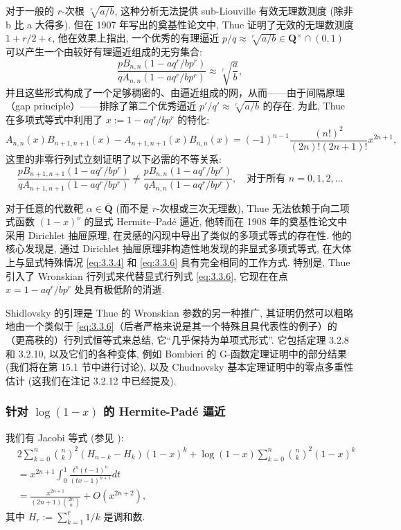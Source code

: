 对于一般的 $r$-次根 \(\sqrt[r]{a/b}\), 这种分析无法提供 sub-Liouville 有效无理数测度 (除非 b 比 a 大得多). 
但在 1907 年写出的奠基性论文中, Thue 证明了无效的无理数测度 \(1+r/2+\epsilon\), 
他在效果上指出, 一个优秀的有理逼近 \(p/q \approx \sqrt[r]{a/b} \in \mathbf{Q}^{\times} \cap (0,1)\) 
可以产生一个由较好有理逼近组成的无穷集合:
\[ \frac{pB_{n,n}\left(1-aq^r/bp^r\right)}{qA_{n,n}\left(1-aq^r/bp^r\right)} \approx \sqrt[r]{\frac{a}{b}}, \]
并且这些形式构成了一个足够稠密的、由逼近组成的网，从而——由于间隔原理（gap principle）——排除了第二个优秀逼近 \(p'/q' \approx \sqrt[r]{a/b}\) 的存在. 
为此, Thue 在多项式等式中利用了 \(x := 1 - aq^r/bp^r\) 的特化:
\begin{equation}\label{eq:3.3.6}
A_{n,n}(x)B_{n+1,n+1}(x) - A_{n+1,n+1}(x)B_{n,n}(x) = (-1)^{n-1} \frac{(n!)^2}{(2n)!(2n+1)!} x^{2n+1},
\end{equation}
这里的非零行列式立刻证明了以下必需的不等关系:
\[ \frac{pB_{n+1,n+1}(1 - aq^r/bp^r)}{qA_{n+1,n+1}(1 - aq^r/bp^r)} \neq \frac{pB_{n,n}(1 - aq^r/bp^r)}{qA_{n,n}(1 - aq^r/bp^r)}, \quad \text{对于所有 } n = 0, 1, 2, \dots \]

对于任意的代数靶 \(\alpha \in \overline{\mathbf{Q}}\) (而不是 $r$-次根或三次无理数), Thue 无法依赖于向二项式函数 \((1-x)^{\nu}\) 的显式 Hermite--Pad{\'e} 逼近, 
他转而在 1908 年的奠基性论文中采用 Dirichlet 抽屉原理, 
在灵感的闪现中导出了类似的多项式等式的存在性. 
他的核心发现是, 通过 Dirichlet 抽屉原理非构造性地发现的非显式多项式等式, 
在大体上与显式特殊情况 \eqref{eq:3.3.4} 和 \eqref{eq:3.3.6} 具有完全相同的工作方式. 
特别是, Thue 引入了 Wronskian 行列式来代替显式行列式 \eqref{eq:3.3.6}, 
它现在在点 \(x = 1 - aq^r/bp^r\) 处具有极低阶的消逝.

Shidlovsky 的引理是 Thue 的 Wronskian 参数的另一种推广, 
其证明仍然可以粗略地由一个类似于 \eqref{eq:3.3.6}（后者严格来说是其一个特殊且具代表性的例子）的（更高秩的）行列式恒等式来总结, 
它“几乎保持为单项式形式”. 
它包括定理 3.2.8 和 3.2.10, 以及它们的各种变体, 
例如 Bombieri 的 G-函数定理证明中的部分结果 \cite{Bom81} (我们将在第 15.1 节中进行讨论), 
以及 Chudnovsky 基本定理证明中的零点多重性估计 \cite{And89} (这我们在注记 3.2.12 中已经提及).

\subsubsection{针对 \(\log(1-x)\) 的 Hermite-Pad{\'e} 逼近}\label{sec:3.3.7}

我们有 Jacobi 等式 \cite{Jac1859} (参见 \cite{Jag64}):
\begin{equation}\label{eq:3.3.8}
    \begin{aligned}
    & 2\sum_{k=0}^{n} {n \choose k}^{2} (H_{n-k} - H_{k}) (1-x)^{k} + \log(1-x) \sum_{k=0}^{n} {n \choose k}^{2} (1-x)^{k}  \\
    &= x^{2n+1} \int_{0}^{1} \frac{t^{n} (t-1)^{n}}{(tx-1)^{n+1}} dt \\
    &= \frac{x^{2n+1}}{(2n+1){2n \choose n}} + O(x^{2n+2}),
    \end{aligned}
\end{equation}
其中 \(H_r := \sum_{k=1}^r 1/k\) 是调和数.

